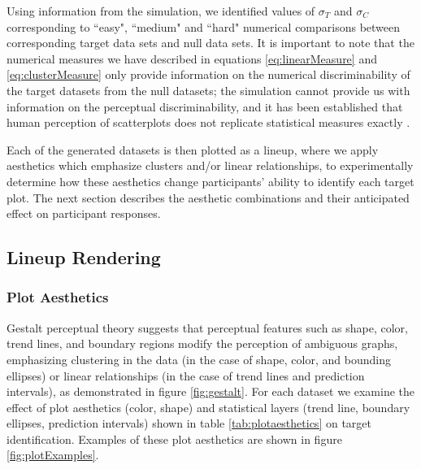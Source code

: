 \documentclass[11pt]{isuthesis}\usepackage[]{graphicx}\usepackage[]{color}
\begin{document}
Using information from the simulation, we identified values of $\sigma_T$ and $\sigma_C$ corresponding to ``easy", ``medium" and ``hard" numerical comparisons between corresponding target data sets and null data sets. It is important to note that the numerical measures we have described in equations \eqref{eq:linearMeasure} and \eqref{eq:clusterMeasure} only provide information on the numerical discriminability of the target datasets from the null datasets; the simulation cannot provide us with information on the perceptual discriminability, and it has been established that human perception of scatterplots does not replicate statistical measures exactly \citep{bobko1979perception, mosteller1981eye, lewandowsky1989perception}.

Each of the generated datasets is then plotted as a lineup, where we apply aesthetics which emphasize clusters and/or linear relationships, to experimentally determine how these aesthetics change participants' ability to identify each target plot. The next section describes the aesthetic combinations and their anticipated effect on participant responses. 

\subsection{Lineup Rendering}
\subsubsection{Plot Aesthetics}
Gestalt perceptual theory suggests that perceptual features such as shape, color, trend lines, and boundary regions modify the perception of ambiguous graphs, emphasizing clustering in the data (in the case of shape, color, and bounding ellipses) or linear relationships (in the case of trend lines and prediction intervals), as demonstrated in figure \ref{fig:gestalt}. For each dataset we examine the effect of plot aesthetics (color, shape) and statistical layers (trend line, boundary ellipses, prediction intervals) shown in table \ref{tab:plotaesthetics}  on target identification. Examples of these plot aesthetics are shown in figure \ref{fig:plotExamples}.
\end{document}
